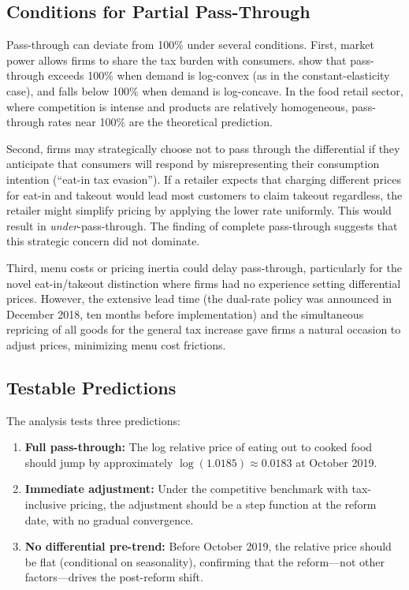 \documentclass[12pt]{article}
\begin{document}
\subsection{Conditions for Partial Pass-Through}

Pass-through can deviate from 100\% under several conditions. First, market power allows firms to share the tax burden with consumers. \citet{weyl2013passthrough} show that pass-through exceeds 100\% when demand is log-convex (as in the constant-elasticity case), and falls below 100\% when demand is log-concave. In the food retail sector, where competition is intense and products are relatively homogeneous, pass-through rates near 100\% are the theoretical prediction.

Second, firms may strategically choose not to pass through the differential if they anticipate that consumers will respond by misrepresenting their consumption intention (``eat-in tax evasion''). If a retailer expects that charging different prices for eat-in and takeout would lead most customers to claim takeout regardless, the retailer might simplify pricing by applying the lower rate uniformly. This would result in \textit{under}-pass-through. The finding of complete pass-through suggests that this strategic concern did not dominate.

Third, menu costs or pricing inertia could delay pass-through, particularly for the novel eat-in/takeout distinction where firms had no experience setting differential prices. However, the extensive lead time (the dual-rate policy was announced in December 2018, ten months before implementation) and the simultaneous repricing of all goods for the general tax increase gave firms a natural occasion to adjust prices, minimizing menu cost frictions.

\subsection{Testable Predictions}

The analysis tests three predictions:

\begin{enumerate}
\item \textbf{Full pass-through:} The log relative price of eating out to cooked food should jump by approximately $\log(1.0185) \approx 0.0183$ at October 2019.
\item \textbf{Immediate adjustment:} Under the competitive benchmark with tax-inclusive pricing, the adjustment should be a step function at the reform date, with no gradual convergence.
\item \textbf{No differential pre-trend:} Before October 2019, the relative price should be flat (conditional on seasonality), confirming that the reform---not other factors---drives the post-reform shift.
\end{enumerate}
\end{document}
